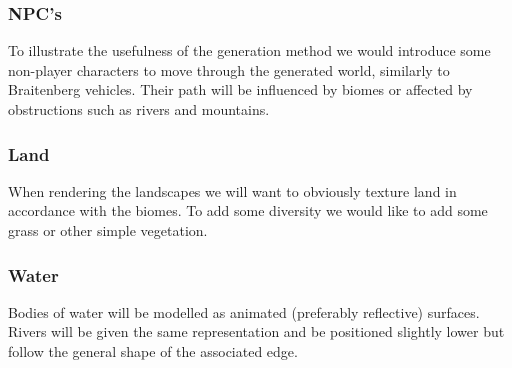 \subsubsection{NPC's}

To illustrate the usefulness of the generation method we would introduce some non-player characters to move through the generated world, similarly to Braitenberg vehicles. Their path will be influenced by biomes or affected by obstructions such as rivers and mountains.

\subsubsection{Land}

When rendering the landscapes we will want to obviously texture land in accordance with the biomes. To add some diversity we would like to add some grass or other simple vegetation.

\subsubsection{Water}

Bodies of water will be modelled as animated (preferably reflective) surfaces. Rivers will be given the same representation and be positioned slightly lower but follow the general shape of the associated edge.